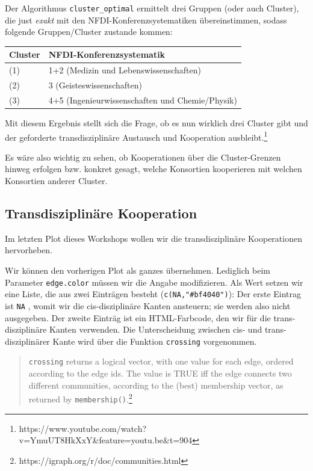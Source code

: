 \documentclass[11pt]{article}
\begin{document}
    Der Algorithmus \texttt{cluster\_optimal} ermittelt drei Gruppen (oder
auch Cluster), die just \emph{exakt} mit den NFDI-Konferenzsystematiken
übereinstimmen, sodass folgende Gruppen/Cluster zustande kommen:

\begin{longtable}[]{@{}ll@{}}
\toprule
Cluster & NFDI-Konferenzsystematik\tabularnewline
\midrule
\endhead
(1) & 1+2 (Medizin und Lebenswissenschaften)\tabularnewline
(2) & 3 (Geisteswissenschaften)\tabularnewline
(3) & 4+5 (Ingenieurwissenschaften und Chemie/Physik)\tabularnewline
\bottomrule
\end{longtable}

Mit diesem Ergebnis stellt sich die Frage, ob es nun wirklich drei
Cluster gibt und der geforderte transdisziplinäre Austausch und
Kooperation ausbleibt.\footnote{https://www.youtube.com/watch?v=YmuUT8HkXxY\&feature=youtu.be\&t=904}

Es wäre also wichtig zu sehen, ob Kooperationen über die Cluster-Grenzen
hinweg erfolgen bzw. konkret gesagt, welche Konsortien kooperieren mit
welchen Konsortien anderer Cluster.

    \hypertarget{transdisziplinuxe4re-kooperation}{%
\subsection{Transdisziplinäre
Kooperation}\label{transdisziplinuxe4re-kooperation}}

Im letzten Plot dieses Workshops wollen wir die transdisziplinäre
Kooperationen hervorheben.

Wir können den vorherigen Plot als ganzes übernehmen. Lediglich beim
Parameter \texttt{edge.color} müssen wir die Angabe modifizieren. Als
Wert setzen wir eine Liste, die aus zwei Einträgen besteht
(\texttt{c(NA,"\#bf4040")}): Der erste Eintrag ist \texttt{NA} , womit
wir die cis-disziplinäre Kanten ansteuern; sie werden also nicht
ausgegeben. Der zweite Einträg ist ein HTML-Farbcode, den wir für die
trans-disziplinäre Kanten verwenden. Die Unterscheidung zwischen cis-
und trans-disziplinärer Kante wird über die Funktion \texttt{crossing}
vorgenommen.

\begin{quote}
\texttt{crossing} returns a logical vector, with one value for each
edge, ordered according to the edge ids. The value is TRUE iff the edge
connects two different communities, according to the (best) membership
vector, as returned by \texttt{membership()}.\footnote{https://igraph.org/r/doc/communities.html}
\end{quote}
\end{document}

